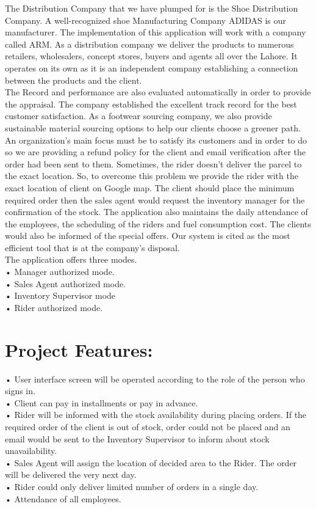 \documentclass[12pt]{article}
\begin{document}
The Distribution Company that we have plumped for is the Shoe Distribution Company. A well-recognized shoe Manufacturing Company ADIDAS is our manufacturer. The implementation of this application will work with a company called ARM. As a distribution company we deliver the products to numerous retailers, wholesalers, concept stores, buyers and agents all over the Lahore. It operates on its own as it is an independent company establishing a connection between the products and the client. \\
The Record and performance are also evaluated automatically in order to provide the appraisal. The company established the excellent track record for the best customer satisfaction. As a footwear sourcing company, we also provide sustainable material sourcing options to help our clients choose a greener path. An organization’s main focus must be to satisfy its customers and in order to do so we are providing a refund policy for the client and email verification after the order had been sent to them. Sometimes, the rider doesn’t deliver the parcel to the exact location. So, to overcome this problem we provide the rider with the exact location of client on Google map. The client should place the minimum required order then the sales agent would request the inventory manager for the confirmation of the stock. The application also maintains the daily attendance of the employees, the scheduling of the riders and fuel consumption cost. The clients would also be informed of the special offers. Our system is cited as the most efficient tool that is at the company’s disposal. \\
The application offers three modes. \\
•	Manager authorized mode. \\
•	Sales Agent authorized mode. \\
•	Inventory Supervisor mode \\
•	Rider authorized mode. \\
	

\section{Project Features:}
•	User interface screen will be operated according to the role of the person who signs in. \\
•	Client can pay in installments or pay in advance. \\
•	Rider will be informed with the stock availability during placing orders. If the required order of the client is out of stock, order could not be placed and an email would be sent to the Inventory Supervisor to inform about stock unavailability. \\
•	Sales Agent will assign the location of decided area to the Rider. The order will be delivered the very next day. \\
•	Rider could only deliver limited number of orders in a single day. \\
•	Attendance of all employees. \\
\end{document}
